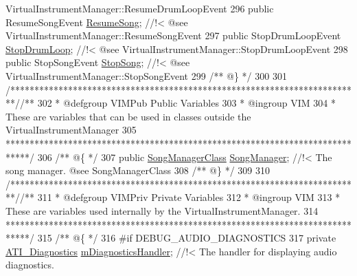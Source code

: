 \begin{DoxyCodeInclude}
{       VirtualInstrumentManager::ResumeDrumLoopEvent}
296 \textcolor{comment}{}    \textcolor{keyword}{public} ResumeSongEvent             \hyperlink{group___v_i_m_events_ga01670916ae3917c84a0fb51667f30ab9}{ResumeSong}; \textcolor{comment}{//!< @see
       VirtualInstrumentManager::ResumeSongEvent}
297 \textcolor{comment}{}    \textcolor{keyword}{public} StopDrumLoopEvent           \hyperlink{group___v_i_m_events_ga9466995fd3b4a07351a8577042ee8b31}{StopDrumLoop}; \textcolor{comment}{//!< @see
       VirtualInstrumentManager::StopDrumLoopEvent}
298 \textcolor{comment}{}    \textcolor{keyword}{public} StopSongEvent               \hyperlink{group___v_i_m_events_gaa9e464629814abf2e4db88e240fac72c}{StopSong}; \textcolor{comment}{//!< @see VirtualInstrumentManager::StopSongEvent}
299 \textcolor{comment}{}\textcolor{comment}{    /** @\} */}
300 
301     \textcolor{comment}{/*************************************************************************/}\textcolor{comment}{/** }
302 \textcolor{comment}{    * @defgroup VIMPub Public Variables}
303 \textcolor{comment}{    * @ingroup VIM}
304 \textcolor{comment}{    * These are variables that can be used in classes outside the VirtualInstrumentManager}
305 \textcolor{comment}{    *****************************************************************************/}\textcolor{comment}{}
306 \textcolor{comment}{    /** @\{ */}
307     \textcolor{keyword}{public} \hyperlink{class_song_manager_class}{SongManagerClass}            \hyperlink{group___v_i_m_pub_ga33dae94932c10c66db76a0eebec76b01}{SongManager}; \textcolor{comment}{//!< The song manager. @see
       SongManagerClass                 }
308 \textcolor{comment}{}\textcolor{comment}{                                                    /** @\} */}
309 
310     \textcolor{comment}{/*************************************************************************/}\textcolor{comment}{/** }
311 \textcolor{comment}{    * @defgroup VIMPriv Private Variables}
312 \textcolor{comment}{    * @ingroup VIM}
313 \textcolor{comment}{    * These are variables used internally by the VirtualInstrumentManager.}
314 \textcolor{comment}{    *****************************************************************************/}\textcolor{comment}{}
315 \textcolor{comment}{    /** @\{ */}
316 \textcolor{preprocessor}{    #if DEBUG\_AUDIO\_DIAGNOSTICS}
317         \textcolor{keyword}{private} \hyperlink{group___audio_testing_class_a_t_i___diagnostics}{ATI\_Diagnostics} \hyperlink{group___v_i_m_priv_gafabe4a874fc21f7bcedf431df3b94201}{mDiagnosticsHandler}; \textcolor{comment}{//!< The handler for
       displaying audio diagnostics.}

\end{DoxyCodeInclude}
